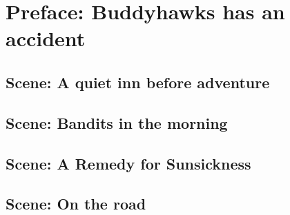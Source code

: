 \section{Preface: Buddyhawks has an accident}
\subsection{Scene: A quiet inn before adventure}
\subsection{Scene: Bandits in the morning}
\subsection{Scene: A Remedy for Sunsickness}
\subsection{Scene: On the road}

